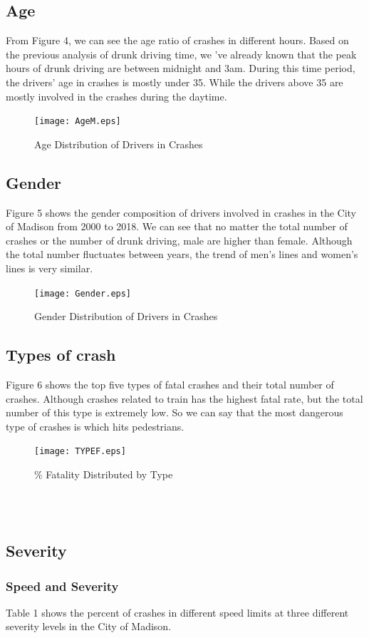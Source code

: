 \documentclass[15pt]{article}
\begin{document}
\subsection{Age}
From Figure 4, we can see the age ratio of crashes in different hours. Based on the previous analysis of drunk driving time, we 've already known that the peak hours of drunk driving are between midnight and 3am. During this time period, the drivers' age in crashes is mostly under 35. While the drivers above 35 are mostly involved in the crashes during the daytime.
\begin{figure}[H]
\centering
\texttt{[image: AgeM.eps]}
\caption{Age Distribution of Drivers in Crashes}
\label{11}
\end{figure}

\newpage
\subsection{Gender}
Figure 5 shows the gender composition of drivers involved in crashes in the City of Madison from 2000 to 2018. We can see that no matter the total number of crashes or the number of drunk driving, male are higher than female. Although the total number fluctuates between years, the trend of men's lines and women's lines is very similar. 
\begin{figure}[H]
\centering
\texttt{[image: Gender.eps]}
\caption{Gender Distribution of Drivers in Crashes}
\label{13}
\end{figure}

\newpage
\subsection{Types of crash}
Figure 6 shows the top five types of fatal crashes and their total number of crashes. Although crashes related to train has the highest fatal rate, but the total number of this type is extremely low. So we can say that the most dangerous type of crashes is which hits pedestrians. 
\begin{figure}[H]
\centering
\texttt{[image: TYPEF.eps]}
\caption{\% Fatality Distributed by Type}
\label{16}
\end{figure}

~\\
~\\
\subsection{Severity}
\subsubsection{Speed and Severity}
Table 1 shows the percent of crashes in different speed limits at three different severity levels in the City of Madison. 
\end{document}
